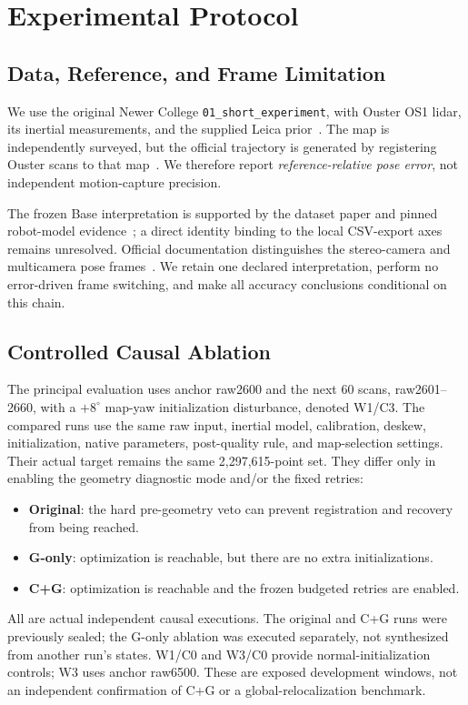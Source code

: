 \documentclass[journal,10pt,letterpaper]{IEEEtran}
\begin{document}
\section{Experimental Protocol}
\subsection{Data, Reference, and Frame Limitation}
We use the original Newer College \texttt{01\_short\_experiment}, with Ouster OS1 lidar, its inertial measurements, and the supplied Leica prior~\cite{newer,ncindex}. The map is independently surveyed, but the official trajectory is generated by registering Ouster scans to that map~\cite{ncref}. We therefore report \emph{reference-relative pose error}, not independent motion-capture precision.

The frozen Base interpretation is supported by the dataset paper and pinned robot-model evidence~\cite{newer,ncframe}; a direct identity binding to the local CSV-export axes remains unresolved. Official documentation distinguishes the stereo-camera and multicamera pose frames~\cite{ncref}. We retain one declared interpretation, perform no error-driven frame switching, and make all accuracy conclusions conditional on this chain.

\subsection{Controlled Causal Ablation}
The principal evaluation uses anchor raw2600 and the next 60 scans, raw2601--2660, with a $+8^\circ$ map-yaw initialization disturbance, denoted W1/C3. The compared runs use the same raw input, inertial model, calibration, deskew, initialization, native parameters, post-quality rule, and map-selection settings. Their actual target remains the same 2,297,615-point set. They differ only in enabling the geometry diagnostic mode and/or the fixed retries:
\begin{itemize}
 \item \textbf{Original}: the hard pre-geometry veto can prevent registration and recovery from being reached.
 \item \textbf{G-only}: optimization is reachable, but there are no extra initializations.
 \item \textbf{C+G}: optimization is reachable and the frozen budgeted retries are enabled.
\end{itemize}
All are actual independent causal executions. The original and C+G runs were previously sealed; the G-only ablation was executed separately, not synthesized from another run's states. W1/C0 and W3/C0 provide normal-initialization controls; W3 uses anchor raw6500. These are exposed development windows, not an independent confirmation of C+G or a global-relocalization benchmark.
\end{document}
